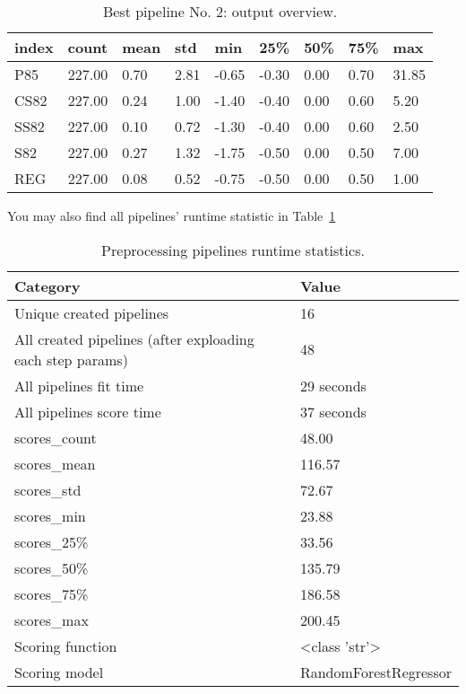 \documentclass{article}%
\begin{document}
%


\begin{table}[H]%
\begin{center}%
\renewcommand{\arraystretch}{1.5}%
\begin{tabular}{l l l l l l l l l}%
\hline%
\textbf{index}&\textbf{count}&\textbf{mean}&\textbf{std}&\textbf{min}&\textbf{25\%}&\textbf{50\%}&\textbf{75\%}&\textbf{max}\\%
\hline%
P85&227.00&0.70&2.81&{-}0.65&{-}0.30&0.00&0.70&31.85\\%
CS82&227.00&0.24&1.00&{-}1.40&{-}0.40&0.00&0.60&5.20\\%
SS82&227.00&0.10&0.72&{-}1.30&{-}0.40&0.00&0.60&2.50\\%
S82&227.00&0.27&1.32&{-}1.75&{-}0.50&0.00&0.50&7.00\\%
REG&227.00&0.08&0.52&{-}0.75&{-}0.50&0.00&0.50&1.00\\%
\hline%
\end{tabular}%
\end{center}%
\caption{Best pipeline No. 2: output overview.}%
\end{table}

%
You may also find all pipelines' runtime statistic in %
Table~\ref{tab:preprocessing_pipelines_runtime_statistics}%


\begin{table}[H]%
\begin{center}%
\renewcommand{\arraystretch}{1.5}%
\begin{tabular}{l l}%
\hline%
\textbf{Category}&\textbf{Value}\\%
\hline%
Unique created pipelines&16\\%
All created pipelines (after exploading each step params)&48\\%
All pipelines fit time&29 seconds\\%
All pipelines score time&37 seconds\\%
scores\_count&48.00\\%
scores\_mean&116.57\\%
scores\_std&72.67\\%
scores\_min&23.88\\%
scores\_25\%&33.56\\%
scores\_50\%&135.79\\%
scores\_75\%&186.58\\%
scores\_max&200.45\\%
Scoring function&<class 'str'>\\%
Scoring model&RandomForestRegressor\\%
\hline%
\end{tabular}%
\end{center}%
\caption{Preprocessing pipelines runtime statistics.}%
\label{tab:preprocessing_pipelines_runtime_statistics}%
\end{table}
\end{document}
